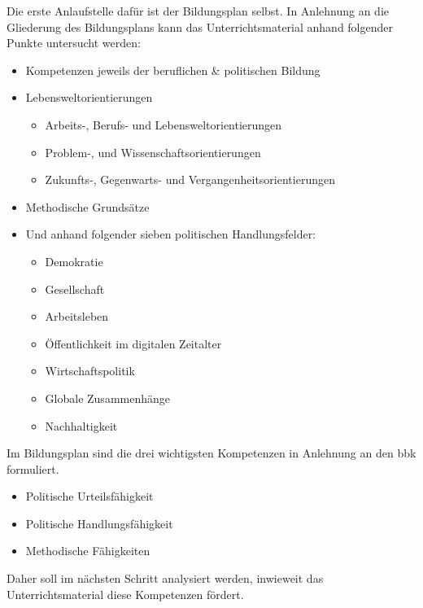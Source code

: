 Die erste Anlaufstelle dafür ist der Bildungsplan selbst. In Anlehnung an die Gliederung des Bildungsplans kann das Unterrichtsmaterial anhand folgender Punkte untersucht werden:
\begin{itemize} 
    \item Kompetenzen jeweils der beruflichen \& politischen Bildung
    \item Lebensweltorientierungen %
    \begin{itemize}
        \item Arbeits-,  Berufs- und Lebensweltorientierungen
        \item Problem-, und Wissenschaftsorientierungen
        \item Zukunfts-, Gegenwarts- und Vergangenheitsorientierungen
    \end{itemize}
    \item Methodische Grundsätze
    \item Und anhand folgender sieben politischen Handlungsfelder:
    \begin{itemize}
        \item Demokratie 
        \item Gesellschaft 
        \item Arbeitsleben
        \item Öffentlichkeit im digitalen Zeitalter
        \item Wirtschaftspolitik
        \item Globale Zusammenhänge 
        \item Nachhaltigkeit 
    \end{itemize}
\end{itemize}

Im Bildungsplan sind die drei wichtigsten Kompetenzen in Anlehnung an den \gls{bbk} formuliert. 

\begin{itemize}
    \item Politische Urteilsfähigkeit
    \item Politische Handlungsfähigkeit
    \item Methodische Fähigkeiten 
\end{itemize}

Daher soll im nächsten Schritt analysiert werden, inwieweit das Unterrichtsmaterial diese Kompetenzen fördert. 




